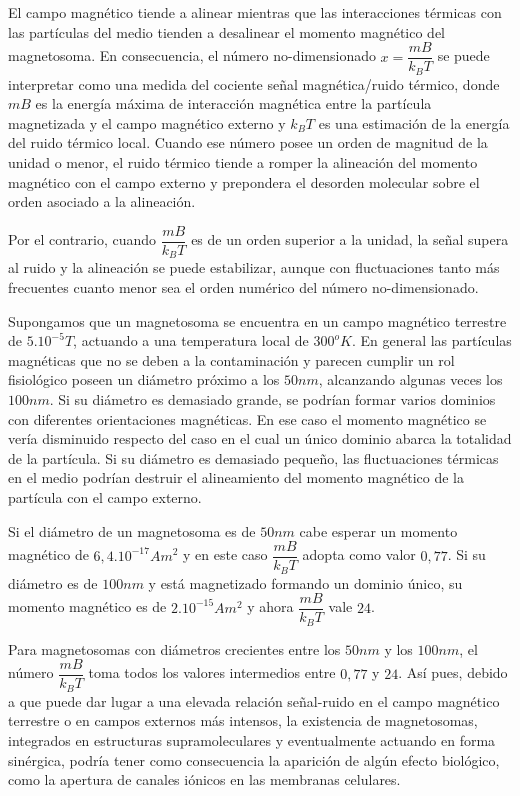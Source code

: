 El campo magnético tiende a alinear mientras que las interacciones térmicas con las partículas del medio tienden a desalinear el momento magnético del magnetosoma. En consecuencia, el número no-dimensionado $x=\dfrac{mB}{k_{B}T}$ se puede interpretar como una medida del cociente señal magnética/ruido térmico, donde $mB$ es la energía máxima de interacción magnética entre la partícula magnetizada y el campo magnético externo y $k_{B}T$ es una estimación de la energía del ruido térmico local. Cuando ese número posee un orden de magnitud de la unidad o menor, el ruido térmico tiende a romper la alineación del momento magnético con el campo externo y prepondera el desorden molecular sobre el orden asociado a la alineación.

Por el contrario, cuando $\dfrac{mB}{k_{B}T}$ es de un orden superior a la unidad, la señal supera al ruido y la alineación se puede estabilizar, aunque con fluctuaciones tanto más frecuentes cuanto menor sea el orden numérico del número no-dimensionado.

Supongamos que un magnetosoma se encuentra en un campo magnético terrestre de $5.10^{-5} T$, actuando a una temperatura local de $300^{o}K$.
En general las partículas magnéticas que no se deben a la contaminación y parecen cumplir un rol fisiológico poseen un diámetro próximo a los $50 nm$, alcanzando algunas veces los $100 nm$. Si su diámetro es demasiado grande, se podrían formar varios dominios con diferentes orientaciones magnéticas. En ese caso el momento magnético se vería disminuido respecto del caso en el cual un único dominio abarca la totalidad de la partícula. Si su diámetro es demasiado pequeño, las fluctuaciones térmicas en el medio podrían destruir el alineamiento del momento magnético de la partícula con el campo externo.

Si el diámetro de un magnetosoma es de $50 nm$ cabe esperar un momento magnético de $6,4.10^{-17} Am^{2}$ y en este caso $\dfrac{mB}{k_{B}T}$ adopta como valor $0,77$. Si su diámetro es de $100 nm$ y está magnetizado formando un dominio único, su momento magnético es de $2.10^{-15} Am^{2}$ y ahora $\dfrac{mB}{k_{B}T}$ vale $24$.


Para magnetosomas con diámetros crecientes entre los $50 nm$ y los $100 nm$, el número $\dfrac{mB}{k_{B}T}$ toma todos los valores intermedios entre $0,77$ y $24$. Así pues, debido a que puede dar lugar a una elevada relación señal-ruido en el campo magnético terrestre o en campos externos más intensos, la existencia de magnetosomas, integrados en estructuras supramoleculares y eventualmente actuando en forma sinérgica, podría tener como consecuencia la aparición de algún efecto biológico, como la apertura de canales iónicos en las membranas celulares.

